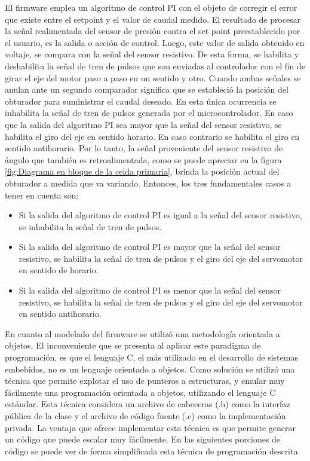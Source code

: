 El firmware emplea un algoritmo de control PI con el objeto de corregir el error que existe entre el setpoint y el valor de caudal medido. El resultado de procesar la señal realimentada del sensor de presión contra el set point preestablecido por el usuario, es la salida o acción de control. Luego, este valor de salida obtenido en voltaje, se compara con la señal del sensor resistivo. De esta forma, se habilita y deshabilita la señal de tren de pulsos que son enviadas al controlador con el fin de girar el eje del motor paso a paso en un sentido y otro.
Cuando ambas señales se anulan ante un segundo comparador significa que  se estableció la posición del obturador para suministrar el caudal deseado. En esta única ocurrencia se inhabilita la señal de tren de pulsos generada por el microcontrolador. En caso que la salida del algoritmo PI sea mayor que la señal del sensor resistivo, se habilita el giro del eje en sentido horario. En caso contrario se habilita el giro en sentido antihorario.     
Por lo tanto, la señal proveniente del sensor resistivo de ángulo que también es retroalimentada, como se puede apreciar en la figura \ref{fig:Diagrama en bloque de la celda primaria}, brinda la posición actual del obturador a medida que va variando. Entonces, los tres fundamentales casos a tener en cuenta son:
\begin{itemize}

\item Si la salida del algoritmo de control PI es igual a la señal del sensor resistivo, se inhabilita la señal de tren de pulsos.
\item Si la salida del algoritmo de control PI es mayor que la señal del sensor resistivo, se habilita la señal de tren de pulsos y el giro del eje del servomotor en sentido de horario.
\item Si la salida del algoritmo de control PI es menor que la señal del sensor resistivo, se habilita la señal de tren de pulsos y el giro del eje del servomotor en sentido antihorario.

\end{itemize}

En cuanto al modelado del firmware se utilizó una metodología orientada a objetos. El inconveniente que se presenta al aplicar este paradigma de programación, es que el lenguaje C, el más utilizado en el desarrollo de sistemas embebidos, no es un lenguaje orientado a objetos.
Como solución se utilizó una técnica que permite explotar el uso de punteros a estructuras, y emular muy fácilmente una programación orientada a objetos, utilizando el lenguaje C estándar\citep{ADT}. Esta técnica considera un archivo de cabeceras (.h) como la interfaz pública de la clase y el archivo de código fuente (.c) como la implementación privada.
La ventaja que ofrece implementar esta técnica es que permite generar un código que puede escalar muy fácilmente.
En las siguientes porciones de código se puede ver de forma simplificada esta técnica de programación descrita.

